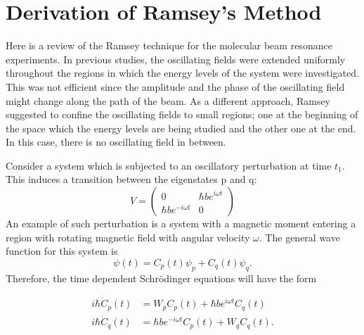 \chapter{Derivation of Ramsey's Method}
Here is a review of the Ramsey technique for the molecular beam
resonance experiments. In previous studies, the oscillating fields
were extended uniformly throughout the regions in which the energy
levels of the system were investigated.  This was not efficient since
the amplitude and the phase of the oscillating field might change
along the path of the beam. As a different approach, Ramsey suggested
to confine the oscillating fields to small regions; one at the
beginning of the space which the energy levels are being studied and
the other one at the end. In this case, there is no oscillating field
in between.

Consider a system which is subjected to an oscillatory perturbation at
time $t_1$. This induces a transition between the eigenstates p and q:
\begin{equation}
V=
\left(
\begin{array}{cc}
0 & \hbar b e^{i\omega t} \\ 
\hbar b e^{-i \omega t} & 0
\end{array} 
\right)
\end{equation}
An example of such perturbation is a system with a magnetic moment
entering a region with rotating magnetic field with angular velocity
$\omega$. The general wave function for this system is
\begin{equation}
\psi(t)= C_p (t) \psi_p + C_q(t) \psi_q.
\end{equation}
Therefore, the time dependent Schr\"{o}dinger equations will have the
form

\begin{align}
 \label{eqn:cp}
  i \hbar \dot{C}_p(t)&= W_p C_p(t)+\hbar b e^{i \omega t} C_q(t) \\
   \label{eqn:cq}
i \hbar \dot{C}_q(t)&=\hbar b e^{-i \omega t} C_p(t) +W_q C_q(t).
\end{align}

